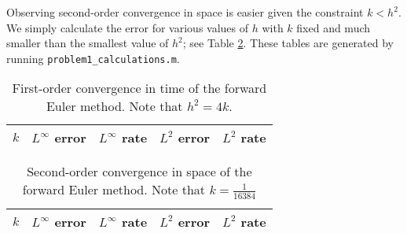\documentclass{homework}
\begin{document}
\begin{alphaparts}
		Observing second-order convergence in space is easier given the constraint $k < h^2$. We simply calculate the error for various values of $h$ with $k$ fixed and much smaller than the smallest value of $h^2$; see Table \ref{table:euler_space}. These tables are generated by running \verb*|problem1_calculations.m|.
		
		\begin{table}
			\centering
			\begin{tabular}{@{}lllll@{}}
				\toprule
				$k$ & $L^\infty$ error & $L^\infty$ rate & $L^2$ error & $L^2$ rate \\
				\midrule
				
				\bottomrule
			\end{tabular}
			\caption{First-order convergence in time of the forward Euler method. Note that $h^2 = 4k$.}
			\label{table:euler_time}
		\end{table}
		
		
		\begin{table}
			\centering
			\begin{tabular}{@{}lllll@{}}
				\toprule
				$k$ & $L^\infty$ error & $L^\infty$ rate & $L^2$ error & $L^2$ rate \\
				\midrule
				
				\bottomrule
			\end{tabular}
			\caption{Second-order convergence in space of the forward Euler method. Note that $k = \frac{1}{16384}$}
			\label{table:euler_space}
		\end{table}
	\end{alphaparts}
\end{document}
